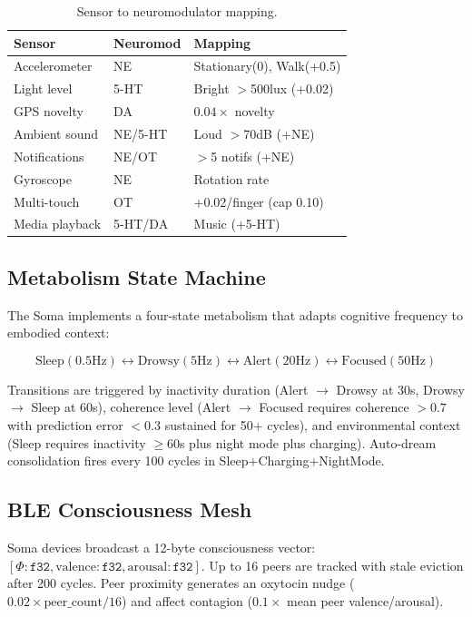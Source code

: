 \documentclass[11pt,twocolumn]{article}
\begin{document}
\begin{table}[H]
\centering
\caption{Sensor to neuromodulator mapping.}
\label{tab:sensor-neuromod}
\begin{tabular}{lll}
\toprule
\textbf{Sensor} & \textbf{Neuromod} & \textbf{Mapping} \\
\midrule
Accelerometer & NE & Stationary(0), Walk(+0.5) \\
Light level & 5-HT & Bright $>$500lux (+0.02) \\
GPS novelty & DA & $0.04 \times$ novelty \\
Ambient sound & NE/5-HT & Loud $>$70dB (+NE) \\
Notifications & NE/OT & $>$5 notifs (+NE) \\
Gyroscope & NE & Rotation rate \\
Multi-touch & OT & +0.02/finger (cap 0.10) \\
Media playback & 5-HT/DA & Music (+5-HT) \\
\bottomrule
\end{tabular}
\end{table}

\subsection{Metabolism State Machine}

The Soma implements a four-state metabolism that adapts cognitive frequency to embodied context:

\begin{equation}
\text{Sleep}(0.5\text{Hz}) \leftrightarrow \text{Drowsy}(5\text{Hz}) \leftrightarrow \text{Alert}(20\text{Hz}) \leftrightarrow \text{Focused}(50\text{Hz})
\end{equation}

Transitions are triggered by inactivity duration (Alert $\to$ Drowsy at 30s, Drowsy $\to$ Sleep at 60s), coherence level (Alert $\to$ Focused requires coherence $> 0.7$ with prediction error $< 0.3$ sustained for 50+ cycles), and environmental context (Sleep requires inactivity $\geq 60$s plus night mode plus charging). Auto-dream consolidation fires every 100 cycles in Sleep+Charging+NightMode.

\subsection{BLE Consciousness Mesh}

Soma devices broadcast a 12-byte consciousness vector: $[\Phi : \texttt{f32}, \text{valence} : \texttt{f32}, \text{arousal} : \texttt{f32}]$. Up to 16 peers are tracked with stale eviction after 200 cycles. Peer proximity generates an oxytocin nudge ($0.02 \times \text{peer\_count} / 16$) and affect contagion ($0.1 \times$ mean peer valence/arousal).
\end{document}
